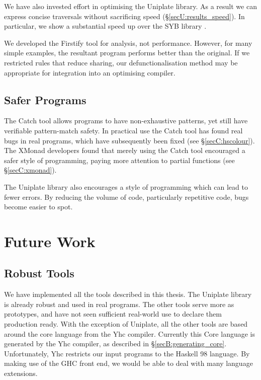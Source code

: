 We have also invested effort in optimising the Uniplate library. As a result we can express concise traversals without sacrificing speed (\S\ref{secU:results_speed}). In particular, we show a substantial speed up over the SYB library \cite{lammel:syb}.

We developed the Firstify tool for analysis, not performance. However, for many simple examples, the resultant program performs better than the original. If we restricted rules that reduce sharing, our defunctionalisation method may be appropriate for integration into an optimising compiler.

\subsection{Safer Programs}

The Catch tool allows programs to have non-exhaustive patterns, yet still have verifiable pattern-match safety. In practical use the Catch tool has found real bugs in real programs, which have subsequently been fixed (see \S\ref{secC:hscolour}). The XMonad developers found that merely using the Catch tool encouraged a safer style of programming, paying more attention to partial functions (see \S\ref{secC:xmonad}).

The Uniplate library also encourages a style of programming which can lead to fewer errors. By reducing the volume of code, particularly repetitive code, bugs become easier to spot.

\section{Future Work}
\label{secE:future_work}

\subsection{Robust Tools}

We have implemented all the tools described in this thesis. The Uniplate library is already robust and used in real programs. The other tools serve more as prototypes, and have not seen sufficient real-world use to declare them production ready. With the exception of Uniplate, all the other tools are based around the core language from the Yhc compiler. Currently this Core language is generated by the Yhc compiler, as described in \S\ref{secB:generating_core}. Unfortunately, Yhc restricts our input programs to the Haskell 98 language. By making use of the GHC front end, we would be able to deal with many language extensions.

